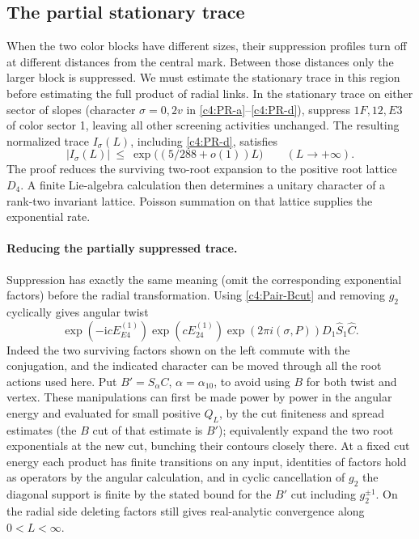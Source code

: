 \subsection{The partial stationary trace}\label{c4:partial-trace}

When the two color blocks have different sizes, their suppression
profiles turn off at different distances from the central mark.  Between
those distances only the larger block is suppressed.  We must estimate
the stationary trace in this region before estimating the full product
of radial links. In the stationary trace on either sector of slopes (character \(\sigma=0,2v\) in \eqref{c4:PR-a}--\eqref{c4:PR-d}), suppress \(1F,12,E3\) of color sector 1, leaving all other screening activities unchanged. The resulting normalized trace \(I_\sigma(L)\), including \eqref{c4:PR-d}, satisfies
\begin{equation}
                    |I_\sigma(L)|\ \le\ \exp\big((5/288+o(1))L\big)
                    \qquad(L\to+\infty).                                 \label{c4:PS-1}
\end{equation}
The proof reduces the surviving two-root expansion to the positive
root lattice \(D_4\).  A finite Lie-algebra calculation then determines a
unitary character of a rank-two invariant lattice.  Poisson summation on
that lattice supplies the exponential rate.

\paragraph{Reducing the partially suppressed trace.} Suppression has exactly the same meaning (omit the corresponding exponential factors) before the radial transformation. Using \eqref{c4:Pair-Bcut} and removing \(g_2\) cyclically gives angular twist
\[
 \exp(-\mathrm{i}c E_{E4}^{(1)})\exp(c E_{24}^{(1)})
       \exp(2\pi i(\sigma,P))D_1\widehat S_1\widehat C.
\]
Indeed the two surviving factors shown on the left commute with the conjugation, and the indicated character can be moved through all the root actions used here. Put \(B'=S_\alpha C\), \(\alpha=\alpha_{10}\), to avoid using \(B\) for both twist and vertex. These manipulations can first be made power by power in the angular energy and evaluated for small positive \(Q_L\), by the cut finiteness and spread estimates (the \(B\) cut of that estimate is \(B'\)); equivalently expand the two root exponentials at the new cut, bunching their contours closely there. At a fixed cut energy each product has finite transitions on any input, identities of factors hold as operators by the angular calculation, and in cyclic cancellation of \(g_2\) the diagonal support is finite by the stated bound for the \(B'\) cut including \(g_2^{\pm1}\). On the radial side deleting factors still gives real-analytic convergence along \(0<L<\infty\).

